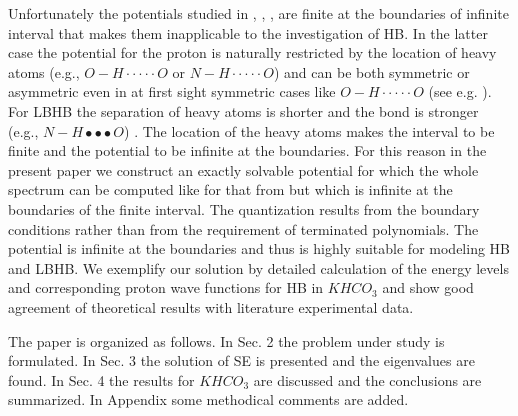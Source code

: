\documentclass[singlespacing]{elsart}
\begin{document}
Unfortunately the  potentials studied in \cite{Xie12}, \cite{Dow13}, \cite{Che13}, \cite{Har14} are finite at the boundaries of infinite interval that makes them inapplicable to the investigation of HB. In the latter case the potential for the proton is naturally restricted by the location of heavy atoms (e.g., $O-H \cdot\cdot\cdot\cdot\cdot O$ or $N-H \cdot\cdot\cdot\cdot\cdot O$) and can be both symmetric or asymmetric even in at first sight symmetric cases like $O-H \cdot\cdot\cdot\cdot\cdot O$ (see e.g. \cite{Fil07}). For  LBHB the separation of heavy atoms is shorter and the bond is stronger (e.g., $N-H \bullet\bullet\bullet O$) \cite{Cle98}. The location of the heavy atoms makes the interval to be finite and the potential to be infinite at the boundaries. For this reason in the present paper we construct an exactly solvable potential for which the whole spectrum can be computed like for that from \cite{Har14} but which is infinite at the boundaries of the finite interval. The quantization results from the boundary conditions rather than from the requirement of terminated polynomials. The potential is infinite at the boundaries and thus is highly suitable for modeling HB and LBHB. We exemplify our solution by detailed calculation of the energy levels and corresponding proton wave functions for HB in $KHCO_3$ and show good agreement of theoretical results with literature experimental data.

The paper is organized as follows.  In Sec. 2 the problem under study is formulated.  In Sec. 3 the solution of SE is presented and the eigenvalues are found. In Sec. 4 the results for $KHCO_3$ are discussed and the conclusions are summarized. In Appendix some methodical comments are added.
\end{document}
